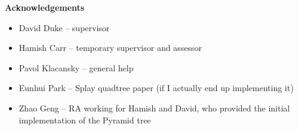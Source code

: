 \begin{center}
    {\LARGE\bf Acknowledgements}
\end{center}

\begin{itemize}
	\item David Duke -- supervisor
	\item Hamish Carr -- temporary supervisor and assessor
	\item Pavol Klacansky -- general help
	\item Eunhui Park -- Splay quadtree paper (if I actually end up implementing it)
	\item Zhao Geng -- RA working for Hamish and David, who provided the initial implementation of the Pyramid tree
\end{itemize}

